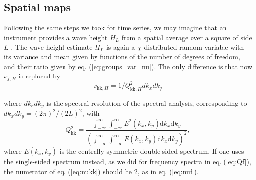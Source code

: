 {\subsection{Spatial maps}
Following the same steps we took for time series, we may imagine that an instrument provides a wave height  $H_{L}$ from a spatial average over a 
square of side $L$ \citep{Lenain&al.2024,Ardhuin&al.2024}. The wave height estimate $H_L$ is  again a $\chi$-distributed random variable with its variance and mean given by  functions of the number of 
degrees of freedom, and their ratio given by eq. (\ref{eq:groups_var_nu}). The only difference is that now  $\nu_{f,H}$ is replaced by 
\begin{equation} 
\nu_{\mathrm{kk},H}=1/ Q_{\mathrm{kk},H}^2 dk_x dk_y \label{eq:nukk}
\end{equation}

 where $dk_x dk_y$ is the spectral resolution of the spectral analysis, corresponding to $dk_x dk_y=(2 \pi)^2/(2 L)^2$, with 
\begin{equation} 
   Q_{\mathrm{kk}}^2 = \frac{  \int_{-\infty}^\infty \int_{-\infty}^\infty E^2(k_x,k_y)\mathrm{d}k_x \mathrm{d}k_y }{\left( \int_{-\infty}^\infty \int_{-\infty}^\infty E(k_x,k_y)\mathrm{d}k_x \mathrm{d}k_y  \right)^2} \label{eq:Qkk},
\end{equation}
where  $E(k_x,k_y)$ is the centrally symmetric double-sided spectrum. If one uses the single-sided spectrum instead, as we did for frequency spectra in eq. (\ref{eq:Qf}), the numerator of eq. (\ref{eq:nukk}) should be 2, as in  eq. (\ref{eq:nuf}). 

}
